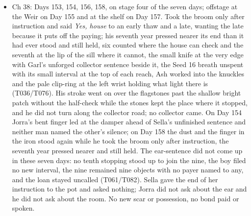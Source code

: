 \documentclass{design/chronicle}
\begin{document}
{\begin{itemize}[leftmargin=1.4em,itemsep=1pt,topsep=3pt,parsep=0pt]
\item Ch 38: Days 153, 154, 156, 158, on stage four of the seven days; offstage at the Weir on Day 155 and at the shelf on Day 157. Took the broom only after instruction and said \emph{Yes, house} to an early thaw and a late, wanting the late because it puts off the paying; his seventh year pressed nearer its end than it had ever stood and still held, six counted where the house can check and the seventh at the lip of the sill where it cannot, the small knife at the very edge with Garl’s unforged collector sentence beside it, the Seed 16 breath unspent with its small interval at the top of each reach, Ash worked into the knuckles and the pale clip-ring at the left wrist holding what light there is (T036/T076). His stroke went on over the flagstones past the shallow bright patch without the half-check while the stones kept the place where it stopped, and he did not turn along the collector road; no collector came. On Day 154 Jorra’s bent finger led at the damper ahead of Sella’s unfinished sentence and neither man named the other’s silence; on Day 158 the dust and the finger in the iron stood again while he took the broom only after instruction, the seventh year pressed nearer and still held. The ear-sentence did not come up in these seven days: no tenth stopping stood up to join the nine, the boy filed no new interval, the nine remained nine objects with no payer named to any, and the loan stayed uncalled (T061/T082). Sella gave the end of her instruction to the pot and asked nothing; Jorra did not ask about the ear and he did not ask about the room. No new scar or possession, no bond paid or spoken.

\end{itemize}

\begin{itemize}[leftmargin=1.4em,itemsep=1pt,topsep=3pt,parsep=0pt]


\end{itemize}}
\end{document}
